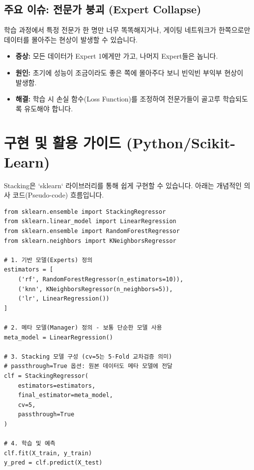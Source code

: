 \documentclass[11pt,a4paper]{book}
\theoremstyle{definition}
\begin{document}
\subsection{주요 이슈: 전문가 붕괴 (Expert Collapse)}
학습 과정에서 특정 전문가 한 명만 너무 똑똑해지거나, 게이팅 네트워크가 한쪽으로만 데이터를 몰아주는 현상이 발생할 수 있습니다.
\begin{itemize}
    \item \textbf{증상:} 모든 데이터가 Expert 1에게만 가고, 나머지 Expert들은 놉니다.
    \item \textbf{원인:} 초기에 성능이 조금이라도 좋은 쪽에 몰아주다 보니 빈익빈 부익부 현상이 발생함.
    \item \textbf{해결:} 학습 시 손실 함수(Loss Function)를 조정하여 전문가들이 골고루 학습되도록 유도해야 합니다.
\end{itemize}


\section{구현 및 활용 가이드 (Python/Scikit-Learn)}

Stacking은 `sklearn` 라이브러리를 통해 쉽게 구현할 수 있습니다. 아래는 개념적인 의사 코드(Pseudo-code) 흐름입니다.

\begin{tcolorbox}[colback=codebg, title={Stacking Regressor 구현 흐름}]
\begin{verbatim}
from sklearn.ensemble import StackingRegressor
from sklearn.linear_model import LinearRegression
from sklearn.ensemble import RandomForestRegressor
from sklearn.neighbors import KNeighborsRegressor

# 1. 기반 모델(Experts) 정의
estimators = [
    ('rf', RandomForestRegressor(n_estimators=10)),
    ('knn', KNeighborsRegressor(n_neighbors=5)),
    ('lr', LinearRegression())
]

# 2. 메타 모델(Manager) 정의 - 보통 단순한 모델 사용
meta_model = LinearRegression()

# 3. Stacking 모델 구성 (cv=5는 5-Fold 교차검증 의미)
# passthrough=True 옵션: 원본 데이터도 메타 모델에 전달
clf = StackingRegressor(
    estimators=estimators,
    final_estimator=meta_model,
    cv=5,
    passthrough=True 
)

# 4. 학습 및 예측
clf.fit(X_train, y_train)
y_pred = clf.predict(X_test)
\end{verbatim}
\end{tcolorbox}
\end{document}
